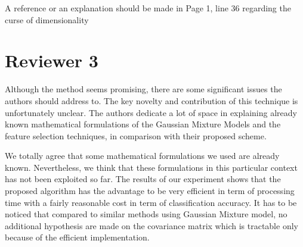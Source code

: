 \documentclass[a4paper,10pt,DIV=16]{scrartcl}
\begin{document}
\begin{revbox}
  A reference or an explanation should be made in Page 1, line 36 regarding the curse of dimensionality
  \begin{resbox}

  \end{resbox}
\end{revbox}

\section{Reviewer 3}


\begin{revbox}
  Although the method seems promising, there are some significant issues the authors should address to. The key novelty and contribution of this technique is unfortunately unclear. The authors dedicate a lot of space in explaining already known mathematical formulations of the Gaussian Mixture Models and the feature selection techniques, in comparison with their proposed scheme.
  \begin{resbox}
    We totally agree that some mathematical formulations we used are already known. Nevertheless, we think that these formulations in this particular context has not been exploited so far. The results of our experiment shows that the proposed algorithm has the advantage to be very efficient in term of processing time with a fairly reasonable cost in term of classification accuracy. It has to be noticed that compared to similar methods using Gaussian Mixture model, no additional hypothesis are made on the covariance matrix which is tractable only because of the efficient implementation.
  \end{resbox}
\end{revbox}
\end{document}
